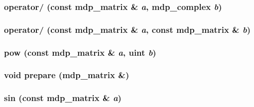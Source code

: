 \label{classmdp__matrix_a5a1dfe012e3c2ab574f2c60f943b36e3}
\hypertarget{classmdp__matrix_afaf1606b270d6b334329a5cdf9a1c959}{
\subsubsection[{operator/}]{ operator/ (const {\bf mdp\_\-matrix} \& {\em a}, \/  {\bf mdp\_\-complex} {\em b})}}
\label{classmdp__matrix_afaf1606b270d6b334329a5cdf9a1c959}
\hypertarget{classmdp__matrix_a9966401a50b7969c45d1fc3e3290f404}{
\subsubsection[{operator/}]{ operator/ (const {\bf mdp\_\-matrix} \& {\em a}, \/  const {\bf mdp\_\-matrix} \& {\em b})}}
\label{classmdp__matrix_a9966401a50b7969c45d1fc3e3290f404}
\hypertarget{classmdp__matrix_aed471057fee36406313f0d6db8469981}{
\subsubsection[{pow}]{ pow (const {\bf mdp\_\-matrix} \& {\em a}, \/  {\bf uint} {\em b})}}
\label{classmdp__matrix_aed471057fee36406313f0d6db8469981}
\hypertarget{classmdp__matrix_a9b5dd55d85b884176c25b3f0967285f0}{
\subsubsection[{prepare}]{\setlength{\rightskip}{0pt plus 5cm}void prepare ({\bf mdp\_\-matrix} \&)}}
\label{classmdp__matrix_a9b5dd55d85b884176c25b3f0967285f0}
\hypertarget{classmdp__matrix_ae7a9b12e9cedc3d6f274c9fe9eb44332}{
\subsubsection[{sin}]{ sin (const {\bf mdp\_\-matrix} \& {\em a})}}
